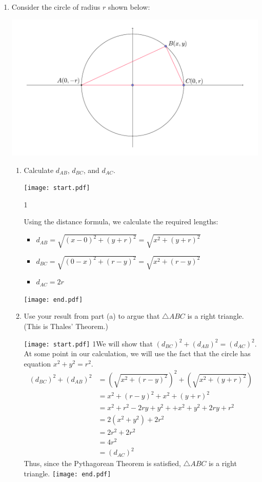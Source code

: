 \documentclass[12pt]{article}
\begin{document}
\begin{enumerate}
\item Consider the circle of radius $r$ shown below:

\begin{center}
\includegraphics[scale=0.5]{circle.pdf}
\end{center}

\begin{enumerate}

\item Calculate $d_{AB}$, $d_{BC}$, and $d_{AC}$.  

\texttt{[image: start.pdf]}
{{{1\linewidth}{Using the distance formula, we calculate the required lengths:
\begin{itemize}
\item $d_{AB}=\sqrt{(x-0)^2+(y+r)^2}=\sqrt{x^2+(y+r)^2}$
\item $d_{BC}=\sqrt{(0-x)^2+(r-y)^2}=\sqrt{x^2+(r-y)^2}$
\item $d_{AC}=2r$
\end{itemize}}}}
\texttt{[image: end.pdf]}


\item Use your result from part (a) to argue that $\triangle ABC$ is a right triangle.  (This is Thales' Theorem.)

\texttt{[image: start.pdf]}
{{{1\linewidth}{We will show that $(d_{BC})^2+(d_{AB})^2=(d_{AC})^2$.  At some point in our calculation, we will use the fact that the circle has equation $x^2+y^2=r^2$.
\begin{align*}
(d_{BC})^2+(d_{AB})^2 &=\left(\sqrt{x^2+(r-y)^2}\right)^2+\left(\sqrt{x^2+(y+r)^2}\right)\\
&=x^2+(r-y)^2+x^2+(y+r)^2\\
&=x^2+r^2-2ry+y^2++x^2 +y^2+2ry+r^2\\
&=2(x^2+y^2)+2r^2\\
&=2r^2+2r^2 \\
&=4r^2\\
&=(d_{AC})^2
\end{align*}
Thus, since the Pythagorean Theorem is satisfied, $\triangle ABC$ is a right triangle.
}}}
\texttt{[image: end.pdf]}



\end{enumerate}
\end{enumerate}
\end{document}
